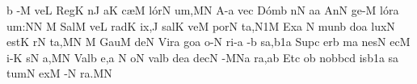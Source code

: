 

\smallskip

\Internote
\nosolesmescustos
\initiumgregorianum
\znotes\fissum{1pt}\bmolle b\en
{}%
\sgn {}-{}\punctum M\egn
\sgn ve{}\punctum L\egn
\spatium
\begingroup
\bgenerale
\sgn Reg\punctum K\egn
\sgn {}{\'\i}n\punctum J\egn
\sgn {}a{}\punctum K\egn
\spatium
\sgn c{\ae}{}\punctum M\egn
\sgn l{\'o}r\punctum N\egn
\sgn {}u{m,}\punctum M\augmentum N\egn
\spatium
\asteriscus
\divisiominor
\spatium
\sgn {}A{-}\punctum a\egn
\sgn ve{}\punctum c\egn
\spatium
\sgn D{\'o}m\punctum b\egn
{}n\punctum N\egn
\sgn {}a{}\punctum a\egn
\spatium
\sgn {}A{n}\punctum N\egn
\sgn ge{-}\punctum M\egn
\sgn l{\'o}r\punctum a\egn
\sgn {}u{m:}\punctum N\augmentum N\egn
\spatium
\divisiominor
\spatium
\custos M
\lineaproxima
\sgn S{a}l\punctum M\egn
\sgn ve{}\punctum L\egn
\spatium
\sgn r{a}d\punctum K\egn
\sgn {}i{x,}\punctum J\egn
\spatium
\sgn s{a}l\punctum K\egn
\sgn ve{}\punctum M\egn
\spatium
\sgn p{o}r\punctum N\egn
\sgn ta{,}\episem N1\punctum M\egn
\spatium
\divisiominor
\spatium
\sgn {}E{x}\punctum a\egn
\spatium
{}\punctum N\egn
\spatium
\sgn m{u}n\punctum b\egn
\sgn do{}\punctum a\egn
\spatium
\sgn lux\punctum N\egn
\spatium
\sgn est\punctum K\egn
\spatium
{}r\punctum N\egn
\sgn ta{,}\punctum M\augmentum N\egn
\spatium
\divisiomaior
\spatium
\custos M
\lineaproxima
\sgn G{a}u\punctum M\egn
\sgn de{}\punctum N\egn
\spatium
\sgn V{i}r\punctum a\egn
\sgn go{}\punctum a\egn
\spatium
{}o{-}\punctum N\egn
\sgn ri{-}\punctum a\egn
{}-\punctum b\egn
\sgn sa{,}\episem b1\punctum a\egn
\spatium
\divisiominor
\spatium
\sgn Sup\punctum c\egn
\sgn {}er\punctum b\egn
\spatium
{}m\punctum a\egn
\sgn nes\punctum N\egn
\spatium
{}ec\punctum M\egn
\sgn {}i{-}\punctum K\egn
{}s\punctum N\egn
\sgn {}a{,}\punctum M\augmentum N\egn
\spatium
\divisiomaior
\spatium
\sgn V{a}l\punctum b\egn
\sgn {}e{,}\punctum a\egn
\spatium
\custos N\lineaproxima
\sgn {}o{}\punctum N\egn
\spatium
\sgn val\punctum b\egn
\sgn de{}\punctum a\egn
\spatium
\sgn dec\punctum N\egn
{}-\quilismascandicus MNa\egn
\sgn ra{,}\punctum a\augmentum b\egn
\spatium
\divisiominor
\spatium
\sgn {}Et\punctum c\egn
\spatium
{}o{}\punctum b\egn
\spatium
\sgn n{o}b\punctum b\nonspatium\pes cd\egn
\sgn {}is\episem b1\punctum a\egn
\spatium
{}s\punctum a\egn
\sgn tum\punctum N\egn
\spatium
\sgn {}e{x}\punctum M\egn
{}-\bivirga N\egn
\sgn ra{.}\punctum M\augmentum N\egn
\spatium
\endgroup
\Finisgregoriana




